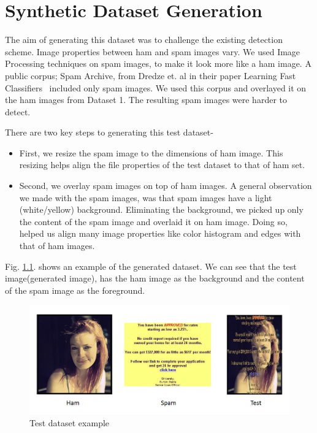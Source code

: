 \chapter{Synthetic Dataset Generation}

\par The aim of generating this dataset was to challenge the existing detection scheme. Image properties between ham and spam images vary. We used Image Processing techniques on spam images, to make it look more like a ham image. A public corpus; Spam Archive, from Dredze et. al in their paper Learning Fast Classifiers~\cite{10} included only spam images. We used this corpus and overlayed it on the ham images from Dataset 1. The resulting spam images were harder to detect.


\par There are two key steps to generating this test dataset- 
\begin{itemize}
	\item First, we resize the spam image to the dimensions of ham image. This resizing helps align the file properties of the test dataset to that of ham set.
	
	\item Second, we overlay spam images on top of ham images. A general observation we made with the spam images, was that spam images have a light (white/yellow) background. Eliminating the background, we picked up only the content of the spam image and overlaid it on ham image. Doing so, helped us align many image properties like color histogram and edges with that of ham images.
	
\end{itemize}

\par Fig. \ref{fig:testDataset}. shows an example of the generated dataset. We can see that the test image(generated image), has the ham image as the background and the content of the spam image as the foreground. 

\begin{figure}[htb]
	\centering
	\includegraphics[scale=0.7]{images/testDataset.PNG}
	\caption{Test dataset example}
	\label{fig:testDataset}
\end{figure} 

